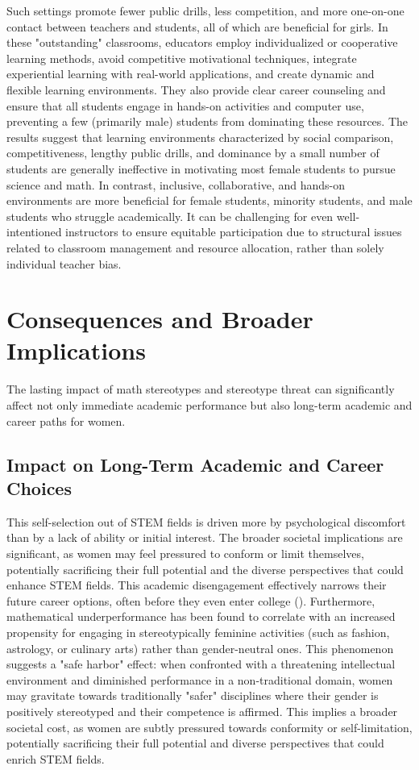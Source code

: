 Such settings promote fewer public drills, less competition, and more one-on-one contact between teachers and students, all of which are beneficial for girls. In these "outstanding" classrooms, educators employ individualized or cooperative learning methods, avoid competitive motivational techniques, integrate experiential learning with real-world applications, and create dynamic and flexible learning environments. They also provide clear career counseling and ensure that all students engage in hands-on activities and computer use, preventing a few (primarily male) students from dominating these resources.
The results suggest that learning environments characterized by social comparison, competitiveness, lengthy public drills, and dominance by a small number of students are generally ineffective in motivating most female students to pursue science and math. In contrast, inclusive, collaborative, and hands-on environments are more beneficial for female students, minority students, and male students who struggle academically. It can be challenging for even well-intentioned instructors to ensure equitable participation due to structural issues related to classroom management and resource allocation, rather than solely individual teacher bias.

\section{Consequences and Broader Implications}
The lasting impact of math stereotypes and stereotype threat can significantly affect not only immediate academic performance but also long-term academic and career paths for women.
\subsection{Impact on Long-Term Academic and Career Choices}

This self-selection out of STEM fields is driven more by psychological discomfort than by a lack of ability or initial interest. The broader societal implications are significant, as women may feel pressured to conform or limit themselves, potentially sacrificing their full potential and the diverse perspectives that could enhance STEM fields. This academic disengagement effectively narrows their future career options, often before they even enter college (\cite{GadassiGati2009}). Furthermore, mathematical underperformance has been found to correlate with an increased propensity for engaging in stereotypically feminine activities (such as fashion, astrology, or culinary arts) rather than gender-neutral ones. This phenomenon suggests a "safe harbor" effect: when confronted with a threatening intellectual environment and diminished performance in a non-traditional domain, women may gravitate towards traditionally "safer" disciplines where their gender is positively stereotyped and their competence is affirmed. This implies a broader societal cost, as women are subtly pressured towards conformity or self-limitation, potentially sacrificing their full potential and diverse perspectives that could enrich STEM fields. 
